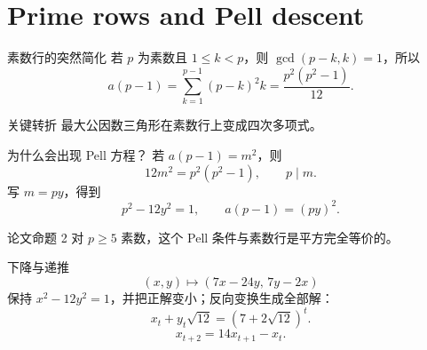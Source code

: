 \documentclass{beamer}
\begin{document}
\section[Pell mechanism]{Prime rows and Pell descent}
\begin{frame}{素数行的突然简化}
  若 $p$ 为素数且 $1\le k<p$，则 $\gcd(p-k,k)=1$，所以
  \[
  a(p-1)=\sum_{k=1}^{p-1}(p-k)^2k
  =\frac{p^2(p^2-1)}{12}.
  \]
  \begin{alertblock}{关键转折}
    最大公因数三角形在素数行上变成四次多项式。
  \end{alertblock}
\end{frame}
\begin{frame}{为什么会出现 Pell 方程？}
  若 $a(p-1)=m^2$，则
  \[
  12m^2=p^2(p^2-1),\qquad p\mid m.
  \]
  写 $m=py$，得到
  \[
  p^2-12y^2=1,\qquad a(p-1)=(py)^2.
  \]
  \begin{block}{论文命题 2}
    对 $p\ge5$ 素数，这个 Pell 条件与素数行是平方完全等价的。
  \end{block}
\end{frame}
\begin{frame}{下降与递推}
  \[
  (x,y)\mapsto(7x-24y,\,7y-2x)
  \]
  保持 $x^2-12y^2=1$，并把正解变小；反向变换生成全部解：
  \[
  x_t+y_t\sqrt{12}=(7+2\sqrt{12})^t.
  \]
  \[
  x_{t+2}=14x_{t+1}-x_t.
  \]
\end{frame}
\end{document}
